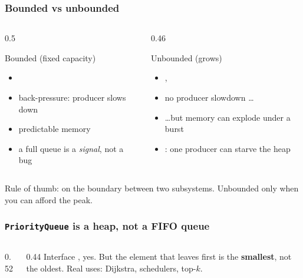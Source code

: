 \documentclass[aspectratio=169,10pt,compress]{beamer}
\begin{document}
\begin{frame}[t,fragile] \frametitle{Bounded vs unbounded}
  \begin{columns}[T]
    \begin{column}{0.5\textwidth}
      \begin{block}{Bounded (fixed capacity)}
        \small
        \begin{itemize}
          \item {}
          \item back-pressure: producer slows down
          \item predictable memory
          \item a full queue is a \emph{signal}, not a bug
        \end{itemize}
      \end{block}
    \end{column}
    \begin{column}{0.46\textwidth}
      \begin{block}{Unbounded (grows)}
        \small
        \begin{itemize}
          \item {}, 
          \item no producer slowdown \dots
          \item \dots but memory can explode under a burst
          \item {}: one producer can starve the heap
        \end{itemize}
      \end{block}
    \end{column}
  \end{columns}
  \vspace{0.5em}
  \small
  Rule of thumb:  on the boundary between two
  subsystems. Unbounded only when you can afford the peak.
\end{frame}




\begin{frame}[t,fragile] \frametitle{\texttt{PriorityQueue} is a heap, not a FIFO queue}
  \begin{columns}[T]
    \begin{column}{0.52\textwidth}
    \end{column}
    \begin{column}{0.44\textwidth}
      \small
      Interface , yes. But the element that leaves first is
      the \textbf{smallest}, not the oldest. Real uses:
      Dijkstra, schedulers, top-$k$.
    \end{column}
  \end{columns}
\end{frame}
\end{document}
